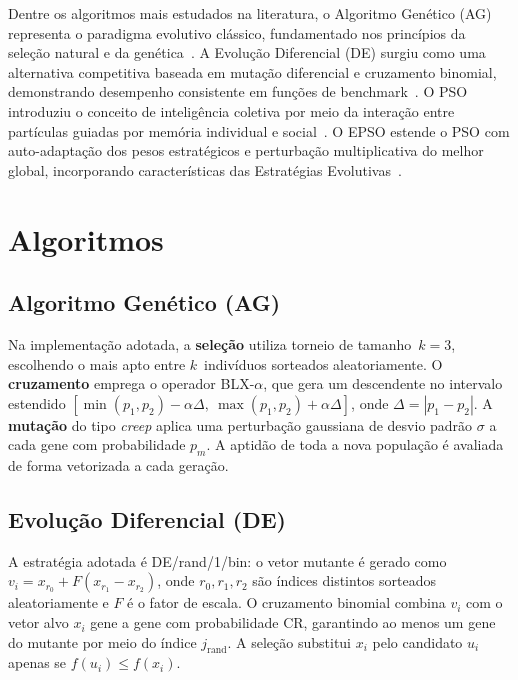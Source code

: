 \documentclass[runningheads]{llncs}
\begin{document}
Dentre os algoritmos mais estudados na literatura, o Algoritmo Genético
(AG) representa o paradigma evolutivo clássico, fundamentado nos
princípios da seleção natural e da genética~\cite{goldberg1989}. A
Evolução Diferencial (DE) surgiu como uma alternativa competitiva
baseada em mutação diferencial e cruzamento binomial, demonstrando
desempenho consistente em funções de benchmark~\cite{storn1997}. O PSO
introduziu o conceito de inteligência coletiva por meio da interação
entre partículas guiadas por memória individual e social~\cite{kennedy1995}.
O EPSO estende o PSO com auto-adaptação dos pesos estratégicos e
perturbação multiplicativa do melhor global, incorporando características
das Estratégias Evolutivas~\cite{miranda2002}.


\section{Algoritmos}\label{sec:algoritmos}

\subsection{Algoritmo Genético (AG)}
Na implementação adotada, a \textbf{seleção} utiliza torneio de
tamanho~$k=3$, escolhendo o mais apto entre $k$~indivíduos sorteados
aleatoriamente. O \textbf{cruzamento} emprega o operador BLX-$\alpha$,
que gera um descendente no intervalo estendido $[\min(p_1, p_2) -
\alpha\Delta,\ \max(p_1, p_2) + \alpha\Delta]$, onde $\Delta =
|p_1 - p_2|$. A \textbf{mutação} do tipo \emph{creep} aplica uma
perturbação gaussiana de desvio padrão $\sigma$ a cada gene com
probabilidade $p_m$. A aptidão de toda a nova população é avaliada
de forma vetorizada a cada geração.

\subsection{Evolução Diferencial (DE)}

A estratégia adotada é DE/rand/1/bin: o vetor mutante é gerado como
$v_i = x_{r_0} + F(x_{r_1} - x_{r_2})$, onde $r_0, r_1, r_2$ são
índices distintos sorteados aleatoriamente e $F$ é o fator de escala.
O cruzamento binomial combina $v_i$ com o vetor alvo $x_i$ gene a
gene com probabilidade CR, garantindo ao menos um gene do mutante por
meio do índice $j_{\text{rand}}$. A seleção substitui $x_i$ pelo
candidato $u_i$ apenas se $f(u_i) \leq f(x_i)$.
\end{document}
